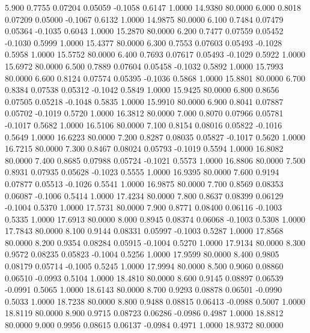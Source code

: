    5.900   0.7755   0.07204   0.05059  -0.1058   0.6147   1.0000  14.9380  80.0000
   6.000   0.8018   0.07209   0.05000  -0.1067   0.6132   1.0000  14.9875  80.0000
   6.100   0.7484   0.07479   0.05364  -0.1035   0.6043   1.0000  15.2870  80.0000
   6.200   0.7477   0.07559   0.05452  -0.1030   0.5999   1.0000  15.4377  80.0000
   6.300   0.7553   0.07603   0.05493  -0.1028   0.5958   1.0000  15.5752  80.0000
   6.400   0.7693   0.07617   0.05493  -0.1029   0.5922   1.0000  15.6972  80.0000
   6.500   0.7889   0.07604   0.05458  -0.1032   0.5892   1.0000  15.7993  80.0000
   6.600   0.8124   0.07574   0.05395  -0.1036   0.5868   1.0000  15.8801  80.0000
   6.700   0.8384   0.07538   0.05312  -0.1042   0.5849   1.0000  15.9425  80.0000
   6.800   0.8656   0.07505   0.05218  -0.1048   0.5835   1.0000  15.9910  80.0000
   6.900   0.8041   0.07887   0.05702  -0.1019   0.5720   1.0000  16.3812  80.0000
   7.000   0.8070   0.07966   0.05781  -0.1017   0.5682   1.0000  16.5106  80.0000
   7.100   0.8154   0.08016   0.05822  -0.1016   0.5649   1.0000  16.6223  80.0000
   7.200   0.8287   0.08035   0.05827  -0.1017   0.5620   1.0000  16.7215  80.0000
   7.300   0.8467   0.08024   0.05793  -0.1019   0.5594   1.0000  16.8082  80.0000
   7.400   0.8685   0.07988   0.05724  -0.1021   0.5573   1.0000  16.8806  80.0000
   7.500   0.8931   0.07935   0.05628  -0.1023   0.5555   1.0000  16.9395  80.0000
   7.600   0.9194   0.07877   0.05513  -0.1026   0.5541   1.0000  16.9875  80.0000
   7.700   0.8569   0.08353   0.06087  -0.1006   0.5414   1.0000  17.4234  80.0000
   7.800   0.8637   0.08399   0.06129  -0.1004   0.5370   1.0000  17.5731  80.0000
   7.900   0.8771   0.08400   0.06116  -0.1003   0.5335   1.0000  17.6913  80.0000
   8.000   0.8945   0.08374   0.06068  -0.1003   0.5308   1.0000  17.7843  80.0000
   8.100   0.9144   0.08331   0.05997  -0.1003   0.5287   1.0000  17.8568  80.0000
   8.200   0.9354   0.08284   0.05915  -0.1004   0.5270   1.0000  17.9134  80.0000
   8.300   0.9572   0.08235   0.05823  -0.1004   0.5256   1.0000  17.9599  80.0000
   8.400   0.9805   0.08179   0.05714  -0.1005   0.5245   1.0000  17.9994  80.0000
   8.500   0.9060   0.08860   0.06510  -0.0993   0.5104   1.0000  18.4810  80.0000
   8.600   0.9145   0.08897   0.06539  -0.0991   0.5065   1.0000  18.6143  80.0000
   8.700   0.9293   0.08878   0.06501  -0.0990   0.5033   1.0000  18.7238  80.0000
   8.800   0.9488   0.08815   0.06413  -0.0988   0.5007   1.0000  18.8119  80.0000
   8.900   0.9715   0.08723   0.06286  -0.0986   0.4987   1.0000  18.8812  80.0000
   9.000   0.9956   0.08615   0.06137  -0.0984   0.4971   1.0000  18.9372  80.0000
